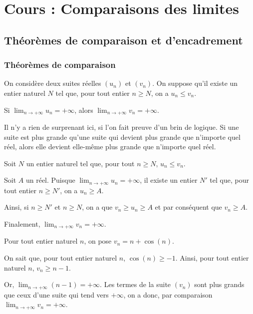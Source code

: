 \documentclass[11pt,fleqn, openany]{book} %
\begin{document}

\chapter{Cours : Comparaisons des limites}

\section{Théorèmes de comparaison et d'encadrement}

\subsection{Théorèmes de comparaison}

\begin{theorem}On considère deux suites réelles $(u_n)$ et $(v_n)$. On suppose qu'il existe un entier naturel $N$ tel que, pour tout entier $n \geqslant N$, on a $u_n \leqslant v_n$. 

Si  $\displaystyle \lim_{n \to +\infty} u_n = +\infty$, alors  $\displaystyle \lim_{n \to +\infty} v_n = +\infty $.\end{theorem}

Il n'y a rien de surprenant ici, si l'on fait preuve d'un brin de logique. Si une suite est plus grande qu'une suite qui devient plus grande que n'importe quel réel, alors elle devient elle-même plus grande que n'importe quel réel.

\begin{demonstration} Soit $N$ un entier naturel tel que, pour tout $n\geqslant N$, $u_n \leqslant v_n$.

Soit $A$ un réel. Puisque $\displaystyle \lim_{n \to +\infty} u_n = +\infty$, il existe un entier $N'$ tel que, pour tout entier $n \geqslant N'$, on a $u_n\geqslant A$.

Ainsi, si $n\geqslant N'$ et $n \geqslant N$, on a que $v_n \geqslant  u_n \geqslant A$ et par conséquent que $v_n \geqslant A$.

Finalement, $\displaystyle \lim_{n \to +\infty	} v_n = +\infty$.
\end{demonstration}

\begin{example} Pour tout entier naturel $n$, on pose $v_n=n+\cos (n)$.

On sait que, pour tout entier naturel $n$, $\cos (n) \geqslant -1$. Ainsi, pour tout entier naturel $n$, $v_n \geqslant n-1$. 

Or,  $\displaystyle \lim_{n \to +\infty} (n-1) = +\infty$. Les termes de la suite $(v_n)$ sont plus grands que ceux d'une suite qui tend vers $+\infty$, on a donc, par comparaison  $\displaystyle \lim_{n \to +\infty} v_n = +\infty $.
\end{example}
\end{document}
